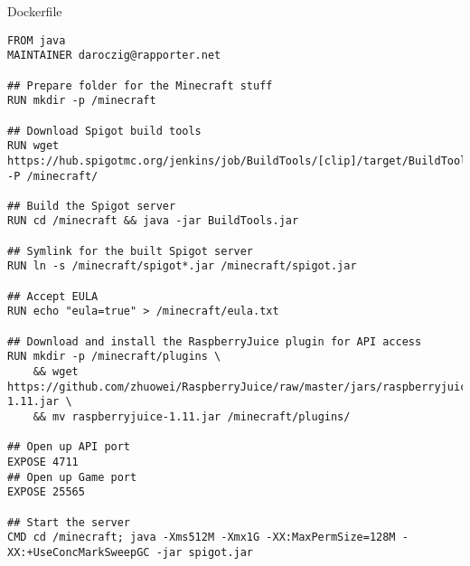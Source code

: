 \documentclass[aspectratio=169,12pt,t]{beamer}
\begin{document}
\begin{frame}[fragile,c]{Dockerfile}

\begin{lstlisting}[basicstyle=\tiny\ttfamily]
FROM java
MAINTAINER daroczig@rapporter.net

## Prepare folder for the Minecraft stuff
RUN mkdir -p /minecraft

## Download Spigot build tools
RUN wget https://hub.spigotmc.org/jenkins/job/BuildTools/[clip]/target/BuildTools.jar -P /minecraft/

## Build the Spigot server
RUN cd /minecraft && java -jar BuildTools.jar

## Symlink for the built Spigot server
RUN ln -s /minecraft/spigot*.jar /minecraft/spigot.jar

## Accept EULA
RUN echo "eula=true" > /minecraft/eula.txt

## Download and install the RaspberryJuice plugin for API access
RUN mkdir -p /minecraft/plugins \
    && wget https://github.com/zhuowei/RaspberryJuice/raw/master/jars/raspberryjuice-1.11.jar \
    && mv raspberryjuice-1.11.jar /minecraft/plugins/

## Open up API port
EXPOSE 4711
## Open up Game port
EXPOSE 25565

## Start the server
CMD cd /minecraft; java -Xms512M -Xmx1G -XX:MaxPermSize=128M -XX:+UseConcMarkSweepGC -jar spigot.jar
\end{lstlisting}

\end{frame}
\end{document}
